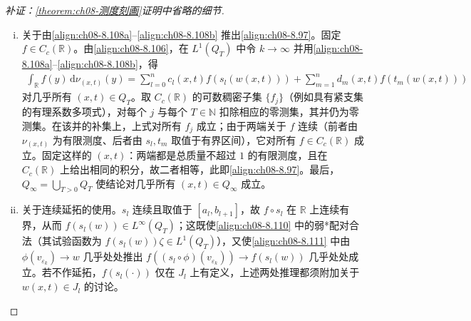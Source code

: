 \documentclass[../../main.tex]{subfiles}%
\begin{document}
\begin{proof}[补证：\cref{theorem:ch08-测度刻画}证明中省略的细节]
\begin{enumerate}[(i)]
\begin{align*}
\operatorname{supp}\nu_{(x,t)}\subseteq\phi^{-1}(w(x,t))=\{y\in\mathbb{R}\mid\phi(y)=w(x,t)\}.
\end{align*}
设 $w(x,t)<A$。对 $y\in I_l$（$l\geqslant1$）有 $\phi(y)>\phi(a_l)\geqslant A>w(x,t)$，对 $y\in\widehat I_m$ 有 $\phi(y)\geqslant\phi(a_m)\geqslant A>w(x,t)$，故 $\{\phi=w(x,t)\}\subseteq I_0$，从而 $\nu_{(x,t)}(I_0)=1$。另一方面，$w(x,t)<A\leqslant\phi(a_l)$ 给出 $w(x,t)\notin J_l$（$l\geqslant1$）与 $w(x,t)\notin\widehat J_m$（因 $w(x,t)<\phi(a_m)$），故按定理中的约定\eqref{align:ch08-8.97} 的右端只剩 $c_0\,\delta_{s_0(w(x,t))}$ 一项，于是
\begin{align*}
1=\nu_{(x,t)}(I_0)=c_0(x,t)\,\delta_{s_0(w(x,t))}(I_0)=c_0(x,t),
\end{align*}
其中末一步用到 $s_0(w(x,t))\in I_0$。$w(x,t)>B$ 的情形对称：此时 $\{\phi=w(x,t)\}\subseteq I_n$、$\nu_{(x,t)}(I_n)=1$，且只有 $c_n$ 可能非零，故 $c_n(x,t)=1$。
\item 关于由\eqref{align:ch08-8.108a}--\eqref{align:ch08-8.108b} 推出\eqref{align:ch08-8.97}。固定 $f\in C_c(\mathbb{R})$。由\eqref{align:ch08-8.106}，在 $L^1(Q_T)$ 中令 $k\to\infty$ 并用\eqref{align:ch08-8.108a}--\eqref{align:ch08-8.108b}，得
\begin{align*}
\int_{\mathbb{R}}f(y)\,\mathrm{d}\nu_{(x,t)}(y)=\sum_{l=0}^nc_l(x,t)f(s_l(w(x,t)))+\sum_{m=1}^nd_m(x,t)f(t_m(w(x,t)))
\end{align*}
对几乎所有 $(x,t)\in Q_T$。取 $C_c(\mathbb{R})$ 的可数稠密子集 $\{f_j\}$（例如具有紧支集的有理系数多项式），对每个 $j$ 与每个 $T\in\mathbb{N}$ 扣除相应的零测集，其并仍为零测集。在该并的补集上，上式对所有 $f_j$ 成立；由于两端关于 $f$ 连续（前者由 $\nu_{(x,t)}$ 为有限测度、后者由 $s_l,t_m$ 取值于有界区间），它对所有 $f\in C_c(\mathbb{R})$ 成立。固定这样的 $(x,t)$：两端都是总质量不超过 $1$ 的有限测度，且在 $C_c(\mathbb{R})$ 上给出相同的积分，故二者相等，此即\eqref{align:ch08-8.97}。最后，$Q_\infty=\bigcup_{T>0}Q_T$ 使结论对几乎所有 $(x,t)\in Q_\infty$ 成立。
\item 关于连续延拓的使用。$s_l$ 连续且取值于 $[a_l,b_{l+1}]$，故 $f\circ s_l$ 在 $\mathbb{R}$ 上连续有界，从而 $f(s_l(w))\in L^\infty(Q_T)$；这既使\eqref{align:ch08-8.110} 中的弱*配对合法（其试验函数为 $f(s_l(w))\zeta\in L^1(Q_T)$），又使\eqref{align:ch08-8.111} 中由 $\phi(v_{\varepsilon_k})\to w$ 几乎处处推出 $f((s_l\circ\phi)(v_{\varepsilon_k}))\to f(s_l(w))$ 几乎处处成立。若不作延拓，$f(s_l(\cdot))$ 仅在 $J_l$ 上有定义，上述两处推理都须附加关于 $w(x,t)\in J_l$ 的讨论。
\end{enumerate}
\end{proof}
\end{document}
